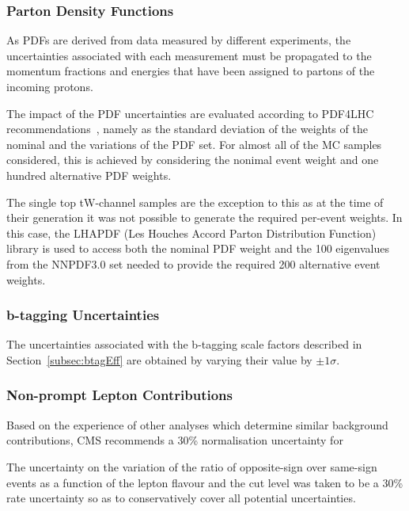 \subsubsection*{Parton Density Functions}\label{subsec:pdfSysts}
As PDFs are derived from data measured by different experiments, the uncertainties associated with each measurement must be propagated to the momentum fractions and energies that have been assigned to partons of the incoming protons.

The impact of the PDF uncertainties are evaluated according to PDF4LHC recommendations~\cite{Butterworth:2015oua}, namely as the standard deviation of the weights of the nominal and the variations of the PDF set.
For almost all of the MC samples considered, this is achieved by considering the nonimal event weight and one hundred alternative PDF weights.

The single top tW-channel samples are the exception to this as at the time of their generation it was not possible to generate the required per-event weights.
In this case, the LHAPDF (Les Houches Accord Parton Distribution Function) library is used to access both the nominal PDF weight and the 100 eigenvalues from the NNPDF3.0 set needed to provide the required 200 alternative event weights.

\subsubsection*{b-tagging Uncertainties}
The uncertainties associated with the b-tagging scale factors described in Section~\ref{subsec:btagEff} are obtained by varying their value by $\pm 1\sigma$.

\subsubsection*{Non-prompt Lepton Contributions}
Based on the experience of other analyses which determine similar background contributions, CMS recommends a 30\% normalisation uncertainty for 
 
The uncertainty on the variation of the ratio of opposite-sign over same-sign events as a function of the lepton flavour and the cut level was taken to be a 30\% rate uncertainty so as to conservatively cover all potential uncertainties.


